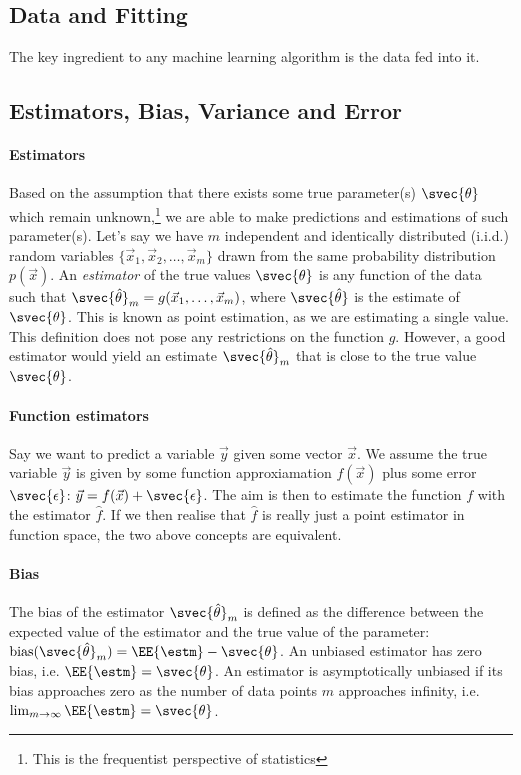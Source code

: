     \subsection{Data and Fitting}
        The key ingredient to any machine learning algorithm is the data fed into it. 

    \subsection{Estimators, Bias, Variance and Error}

        \paragraph{Estimators} 
        Based on the assumption that there exists some true parameter(s) $\svec{\theta}$ which remain unknown,\footnote{This is the frequentist perspective of statistics} we are able to make predictions and estimations of such parameter(s). Let's say we have $m$ independent and identically distributed (i.i.d.) random variables $\{\vec{x}_1, \vec{x}_2, \dots, \vec{x}_m\}$ drawn from the same probability distribution $p(\vec{x})$. An \textit{estimator} of the true values $\svec{\theta}$ is any function of the data such that $\svec{\hat{\theta}}_m = g(\vec{x}_1,\dots,\vec{x}_m)$, where $\svec{\hat{\theta}}$ is the estimate of $\svec{\theta}$. This is known as point estimation, as we are estimating a single value. This definition does not pose any restrictions on the function $g$. However, a good estimator would yield an estimate $\svec{\hat{\theta}}_m$ that is close to the true value $\svec{\theta}$. 
        \paragraph{Function estimators}
        Say we want to predict a variable $\vec{y}$ given some vector $\vec{x}$. We assume the true variable $\vec{y}$ is given by some function approxiamation $f(\vec{x})$ plus some error $\svec{\epsilon}$: $\vec{y} = f(\vec{x}) + \svec{\epsilon}$. The aim is then to estimate the function $f$ with the estimator $\hat{f}$. If we then realise that $\hat{f}$ is really just a point estimator in function space, the two above concepts are equivalent.

        \paragraph{Bias}
        The bias of the estimator $\svec{\hat{\theta}}_m$ is defined as the difference between the expected value of the estimator and the true value of the parameter: $\text{bias}(\svec{\hat{\theta}}_m) = \EE{\estm} - \svec{\theta}$. An unbiased estimator has zero bias, i.e. $\EE{\estm} = \svec{\theta}$. An estimator is asymptotically unbiased if its bias approaches zero as the number of data points $m$ approaches infinity, i.e. $\lim_{m\to\infty} \EE{\estm} = \svec{\theta}$.


